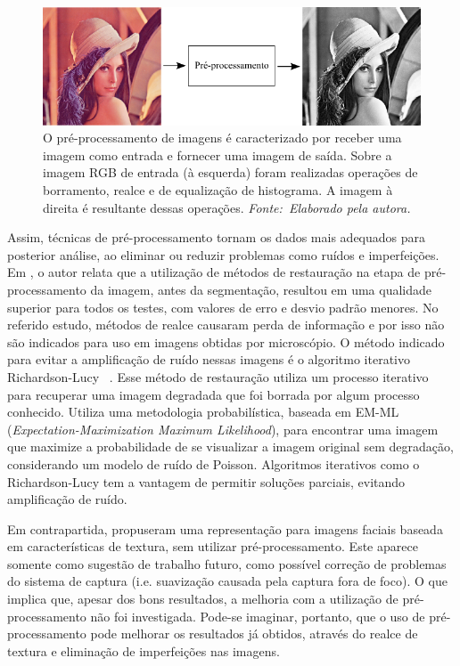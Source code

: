 \vspace{12pt}
\begin{figure}[!htbp]
 \begin{center}
   \includegraphics[width=1\linewidth]{figuras/preprocessamento.png}
 \caption[Sobre a imagem RGB de entrada foram realizadas operações de borramento, realce e de equalização de histograma. A imagem à direita é resultante dessas operações.]{O pré-processamento de imagens é caracterizado por receber uma imagem como entrada e fornecer uma imagem de saída. Sobre a imagem RGB de entrada (à esquerda) foram realizadas operações de borramento, realce e de equalização de histograma. A imagem à direita é resultante dessas operações. \textit{Fonte:~Elaborado pela autora.}}
 \label{fig:preproc}
 \end{center}
\end{figure}

Assim, técnicas de pré-processamento tornam os dados mais adequados para posterior análise, ao eliminar ou reduzir problemas como ruídos e imperfeições. Em , o autor relata que a utilização de métodos de restauração na etapa de pré-processamento da imagem, antes da segmentação, resultou em uma qualidade superior para todos os testes, com valores de erro e desvio padrão menores. No referido estudo, métodos de realce causaram perda de informação e por isso não são indicados para uso em imagens obtidas por microscópio. O método indicado para evitar a amplificação de ruído nessas imagens é o algoritmo iterativo Richardson-Lucy ~\cite{Ponti-Jr2011}. Esse método de restauração utiliza um processo iterativo para recuperar uma imagem degradada que foi borrada por algum processo conhecido. Utiliza uma metodologia probabilística, baseada em EM-ML (\textit{Expectation-Maximization Maximum Likelihood}), para encontrar uma imagem que maximize a probabilidade de se visualizar a imagem original sem degradação, considerando um modelo de ruído de Poisson. Algoritmos iterativos como o Richardson-Lucy tem a vantagem de permitir soluções parciais, evitando amplificação de ruído.

Em contrapartida,  propuseram uma representação para imagens faciais baseada em características de textura, sem utilizar pré-processamento. Este aparece somente como sugestão de trabalho futuro, como possível correção de problemas do sistema de captura (i.e. suavização causada pela captura fora de foco). O que implica que, apesar dos bons resultados, a melhoria com a utilização de pré-processamento não foi investigada. Pode-se imaginar, portanto, que o uso de pré-processamento pode melhorar os resultados já obtidos, através do realce de textura e eliminação de imperfeições nas imagens.

